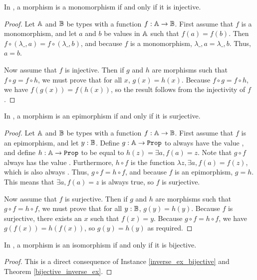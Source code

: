 \documentclass[../../math.tex]{subfiles}
\begin{document}
\begin{theorem}
    In \Type, a morphism is a monomorphism if and only if it is injective.
\end{theorem}
\begin{proof}
    Let $\mathbb{A}$ and $\mathbb{B}$ be types with a function $f : \mathbb{A} \to \mathbb{B}$.  First assume
    that $f$ is a monomorphism, and let $a$ and $b$ be values in $\mathbb{A}$ such that
    $f(a) = f(b)$.  Then $f \circ (\lambda \_, a) = f \circ (\lambda \_, b)$,
    and because $f$ is a monomorphism, $\lambda \_, a = \lambda \_, b$.  Thus,
    $a = b$.

    Now assume that $f$ is injective.  Then if $g$ and $h$ are morphisms such
    that $f \circ g = f \circ h$, we must prove that for all $x$, $g(x) = h(x)$.
    Because $f \circ g = f \circ h$, we have $f(g(x)) = f(h(x))$, so the result
    follows from the injectivity of $f$.
\end{proof}

\begin{theorem}
    In \Type, a morphism is an epimorphism if and only if it is surjective.
\end{theorem}
\begin{proof}
    Let $\mathbb{A}$ and $\mathbb{B}$ be types with a function $f : \mathbb{A} \to \mathbb{B}$.  First assume
    that $f$ is an epimorphism, and let $y : \mathbb{B}$.  Define $g : \A \to \Prop$ to
    always have the value , and define $h : \A \to \Prop$ to be equal
    to $h(z) = \exists a, f(a) = z$.  Note that $g \circ f$ always has the value
    .  Furthermore, $h \circ f$ is the function $\lambda z, \exists a,
    f(a) = f(z)$, which is also always .  Thus, $g \circ f = h \circ
    f$, and because $f$ is an epimorphism, $g = h$.  This means that $\exists a,
    f(a) = z$ is always true, so $f$ is surjective.

    Now assume that $f$ is surjective.  Then if $g$ and $h$ are morphisms such
    that $g \circ f = h \circ f$, we must prove that for all $y : \mathbb{B}$, $g(y) =
    h(y)$.  Because $f$ is surjective, there exists an $x$ such that $f(x) = y$.
    Because $g \circ f = h \circ f$, we have $g(f(x)) = h(f(x))$, so $g(y) =
    h(y)$ as required.
\end{proof}

\begin{theorem}
    In \Type, a morphism is an isomorphism if and only if it is bijective.
\end{theorem}
\begin{proof}
    This is a direct consequence of Instance \ref{inverse_ex_bijective} and
    Theorem \ref{bijective_inverse_ex}.
\end{proof}
\end{document}
